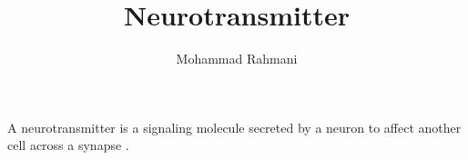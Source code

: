 \documentclass[a4paper]{article}
\title{Neurotransmitter}
\date{}
\author{Mohammad Rahmani}
\begin{document}
\maketitle
    A neurotransmitter is a signaling molecule secreted by a neuron to affect another cell across a synapse \seeherefooter{}.
    
    
\end{document}
